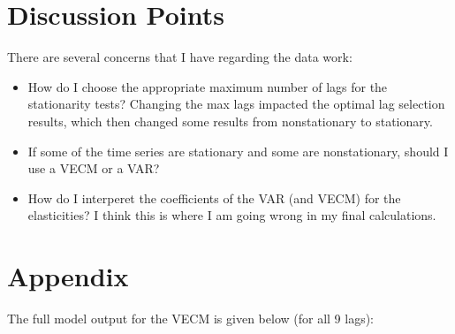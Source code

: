 \documentclass[11pt,preprint, authoryear]{elsarticle}
\numberwithin{equation}{section}
\numberwithin{figure}{section}
\numberwithin{table}{section}
\begin{document}
\hypertarget{discussion-points}{%
\section{\texorpdfstring{Discussion Points
\label{discuss}}{Discussion Points }}\label{discussion-points}}

There are several concerns that I have regarding the data work:

\begin{itemize}
\item
  How do I choose the appropriate maximum number of lags for the
  stationarity tests? Changing the max lags impacted the optimal lag
  selection results, which then changed some results from nonstationary
  to stationary.
\item
  If some of the time series are stationary and some are nonstationary,
  should I use a VECM or a VAR?
\item
  How do I interperet the coefficients of the VAR (and VECM) for the
  elasticities? I think this is where I am going wrong in my final
  calculations.
\end{itemize}

\newpage

\hypertarget{appendix}{%
\section*{\texorpdfstring{Appendix
\label{app}}{Appendix }}\label{appendix}}

The full model output for the VECM is given below (for all 9 lags):
\end{document}
